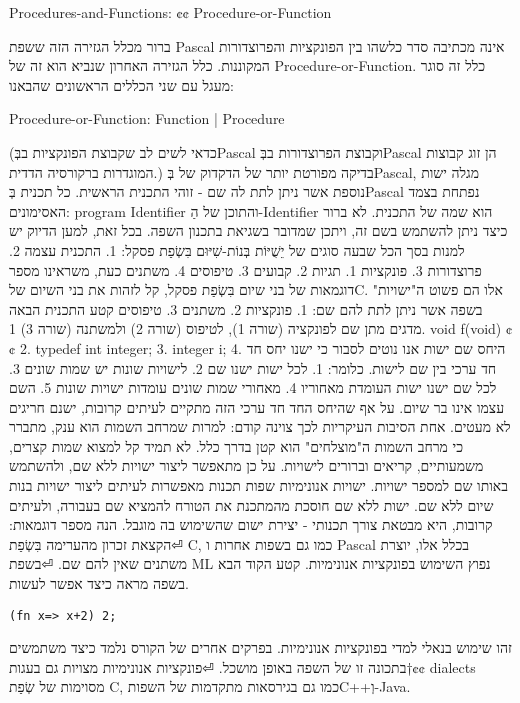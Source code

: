 \begin{טבלא}[!htbp]
      Procedures-and-Functions:
      {¢¢ Procedure-or-Function }

      ברור מכלל הגזירה הזה ששפת Pascal אינה מכתיבה סדר כלשהו בין הפונקציות והפרוצדורות המקוננות. כלל הגזירה האחרון שנביא הוא זה של Procedure-or-Function. כלל זה סוגר מעגל עם שני הכללים הראשונים שהבאנו:

      Procedure-or-Function:
      Function | Procedure

      (כדאי לשים לב שקבוצת הפונקציות בבְּPascal וקבוצת הפרוצדורות בבְּPascal הן זוג קבוצות המוגדרות ברקורסיה הדדית.)
      בדיקה מפורטת יותר של הדקדוק של בְּPascal, מגלה ישות נוספת אשר ניתן לתת לה שם - זוהי התכנית הראשית. כל תכנית בְּPascal נפתחת בצמד האסימונים: program Identifier והתוכן של הַ-Identifier הוא שמה של התכנית. לא ברור כיצד ניתן להשתמש בשם זה, ויתכן שמדובר בשגיאת בתכנון השפה. בכל זאת, למען הדיוק יש למנות בסך הכל שבעה סוגים של יֵשֻׁיּוֹת בְּנוֹת-שִׁיּוּם בִּשְׂפַת פסקל:
      1. התכנית עצמה
      2. פרוצדורות
      3. פונקציות
      1. תגיות
      2. קבועים
      3. טיפוסים
      4. משתנים
      כעת, משראינו מספר דוגמאות של בני שיום בִּשְׂפַת פסקל, קל לזהות את בני השיום שלC. אלו הם פשוט ה"ישויות" בשפה אשר ניתן לתת להם שם:
      1. פונקציות
      2. משתנים
      3. טיפוסים
      קטע התכנית הבאה מדגים מתן שם לפונקציה (שורה 1), לטיפוס (שורה 2) ולמשתנה (שורה 3)
      1. void f(void) {¢¢
        2. typedef int integer;
        3. integer i;
      4. }
      היחס שם ישות
      אנו נוטים לסבור כי ישנו יחס חד חד ערכי בין שם לישות. כלומר:
      1. לכל ישות ישנו שם
      2. לישויות שונות יש שמות שונים
      3. לכל שם ישנו ישות העומדת מאחוריו
      4. מאחורי שמות שונים עומדות ישויות שונות
      5. השם עצמו אינו בר שיום.
      על אף שהיחס החד חד ערכי הזה מתקיים לעיתים קרובות, ישנם חריגים לא מעטים. אחת הסיבות העיקריות לכך צוינה קודם: למרות שמרחב השמות הוא ענק, מתברר כי מרחב השמות ה"מוצלחים" הוא קטן בדרך כלל. לא תמיד קל למצוא שמות קצרים, משמעותיים, קריאים וברורים לישויות. על כן מתאפשר ליצור ישויות ללא שם, ולהשתמש באותו שם למספר ישויות.
      ישויות אנונימיות
      שפות תכנות מאפשרות לעיתים ליצור ישויות בנות שיום ללא שם. ישות ללא שם חוסכת מהמתכנת את הטורח להמציא שם בעבורה, ולעיתים קרובות, היא מבטאת צורך תכנותי - יצירת ישום שהשימוש בה מוגבל.
      הנה מספר דוגמאות:
⏎הקצאת זכרון מהערימה בִּשְׂפַת C, כמו גם בשפות אחרות ו Pascal בכלל אלו, יוצרת משתנים שאין להם שם.
⏎בשפת ML נפוץ השימוש בפונקציות אנונימיות. קטע הקוד הבא בשפה מראה כיצד אפשר לעשות.
\begin{verbatim}
(fn x=> x+2) 2;
\end{verbatim}
   זהו שימוש בנאלי למדי בפונקציות אנונימיות. בפרקים אחרים של הקורס נלמד כיצד משתמשים בתכונה זו של השפה באופן מושכל.
⏎פונקציות אנונימיות מצויות גם בעגות†{¢¢ dialects} מסוימות של שְׂפַת C, כמו גם בגירסאות מתקדמות של השפותC++וְ-Java.


\end{טבלא}
